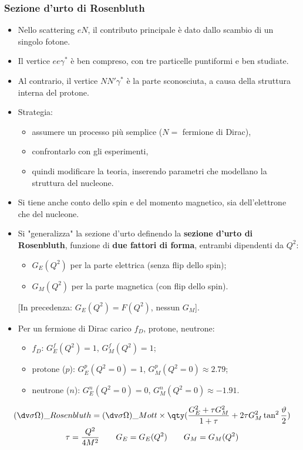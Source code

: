 \subsubsection{Sezione d'urto di Rosenbluth}
\begin{itemize}
    \item Nello scattering $eN$, il contributo principale è dato dallo scambio di un singolo fotone.
    \item Il vertice $ee\gamma^*$ è ben compreso, con tre particelle puntiformi e ben studiate.
    \item Al contrario, il vertice $NN'\gamma^*$ è la parte sconosciuta, a causa della struttura interna del protone.
    \item Strategia:
    \begin{itemize}
        \item assumere un processo più semplice ($N =$ fermione di Dirac),
        \item confrontarlo con gli esperimenti,
        \item quindi modificare la teoria, inserendo parametri che modellano la struttura del nucleone.
    \end{itemize}
    \item Si tiene anche conto dello spin e del momento magnetico, sia dell'elettrone che del nucleone.
    \item Si "generalizza" la sezione d'urto definendo la \textbf{sezione d'urto di Rosenbluth}, funzione di \textbf{due fattori di forma}, entrambi dipendenti da $Q^2$:
    \begin{itemize}
        \item $G_E(Q^2)$ per la parte elettrica (senza flip dello spin);
        \item $G_M(Q^2)$ per la parte magnetica (con flip dello spin).
    \end{itemize}
    [In precedenza: $G_E(Q^2) = F(Q^2)$, nessun $G_M$].
    \item Per un fermione di Dirac carico $f_D$, protone, neutrone:
    \begin{itemize}
        \item $f_D$: $G_E^f(Q^2) = 1$, $G_M^f(Q^2) = 1$;
        \item protone ($p$): $G_E^p(Q^2 = 0) = 1$, $G_M^p(Q^2 = 0) \approx 2.79$;
        \item neutrone ($n$): $G_E^n(Q^2 = 0) = 0$, $G_M^n(Q^2 = 0) \approx -1.91$.
    \end{itemize}
\end{itemize}
\begin{gather*}
    (\dv\sigma\Omega)\_{Rosenbluth}=(\dv\sigma\Omega)\_{Mott}\times\qty(\frac{G_E^2+\tau G_M^2}{1+\tau}+2\tau G_M^2\tan^2\frac\vartheta2)\\
    \tau=\frac{Q^2}{4M^2}\qquad G_E=G_E(Q^2)\qquad G_M=G_M(Q^2)
\end{gather*}
